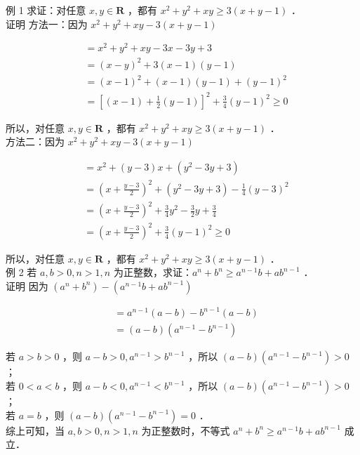\documentclass[10pt]{article}
\begin{document}
例 1 求证：对任意 \(x, y \in \mathbf{R}\) ，都有 \(x^{2}+y^{2}+x y \geqslant 3(x+y-1)\) ．\\
证明 方法一：因为 \(x^{2}+y^{2}+x y-3(x+y-1)\)

\[
\begin{aligned}
& =x^{2}+y^{2}+x y-3 x-3 y+3 \\
& =(x-y)^{2}+3(x-1)(y-1) \\
& =(x-1)^{2}+(x-1)(y-1)+(y-1)^{2} \\
& =\left[(x-1)+\frac{1}{2}(y-1)\right]^{2}+\frac{3}{4}(y-1)^{2} \geqslant 0
\end{aligned}
\]

所以，对任意 \(x, y \in \mathbf{R}\) ，都有 \(x^{2}+y^{2}+x y \geqslant 3(x+y-1)\) ．\\
方法二：因为 \(x^{2}+y^{2}+x y-3(x+y-1)\)

\[
\begin{aligned}
& =x^{2}+(y-3) x+\left(y^{2}-3 y+3\right) \\
& =\left(x+\frac{y-3}{2}\right)^{2}+\left(y^{2}-3 y+3\right)-\frac{1}{4}(y-3)^{2} \\
& =\left(x+\frac{y-3}{2}\right)^{2}+\frac{3}{4} y^{2}-\frac{3}{2} y+\frac{3}{4} \\
& =\left(x+\frac{y-3}{2}\right)^{2}+\frac{3}{4}(y-1)^{2} \geqslant 0
\end{aligned}
\]

所以，对任意 \(x, y \in \mathbf{R}\) ，都有 \(x^{2}+y^{2}+x y \geqslant 3(x+y-1)\) ．\\
例 2 若 \(a, b>0, n>1, n\) 为正整数，求证：\(a^{n}+b^{n} \geqslant a^{n-1} b+a b^{n-1}\) ．\\
证明 因为 \(\left(a^{n}+b^{n}\right)-\left(a^{n-1} b+a b^{n-1}\right)\)

\[
\begin{aligned}
& =a^{n-1}(a-b)-b^{n-1}(a-b) \\
& =(a-b)\left(a^{n-1}-b^{n-1}\right)
\end{aligned}
\]

若 \(a>b>0\) ，则 \(a-b>0, a^{n-1}>b^{n-1}\) ，所以 \((a-b)\left(a^{n-1}-b^{n-1}\right)>0\) ；\\
若 \(0<a<b\) ，则 \(a-b<0, a^{n-1}<b^{n-1}\) ，所以 \((a-b)\left(a^{n-1}-b^{n-1}\right)>0\) ；\\
若 \(a=b\) ，则 \((a-b)\left(a^{n-1}-b^{n-1}\right)=0\) ．\\
综上可知，当 \(a, b>0, n>1, n\) 为正整数时，不等式 \(a^{n}+b^{n} \geqslant a^{n-1} b+a b^{n-1}\) 成立．
\end{document}
